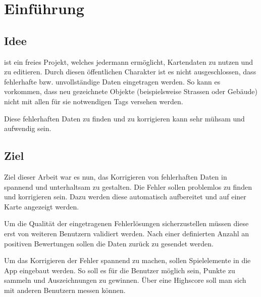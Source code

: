 \section{Einführung}

\subsection{Idee}
 ist ein freies Projekt, welches jedermann ermöglicht, Kartendaten zu nutzen und zu editieren.
Durch diesen öffentlichen Charakter ist es nicht ausgeschlossen, dass fehlerhafte bzw. unvollständige Daten eingetragen werden.
So kann es vorkommen, dass neu gezeichnete Objekte (beispielsweise Strassen oder Gebäude) nicht mit allen für sie notwendigen \glspl{Tag} versehen werden.

Diese fehlerhaften Daten zu finden und zu korrigieren kann sehr mühsam und aufwendig sein.

\subsection{Ziel}
Ziel dieser Arbeit war es nun, das Korrigieren von fehlerhaften Daten in  spannend und unterhaltsam zu gestalten.
Die Fehler sollen problemlos zu finden und korrigieren sein.
Dazu werden diese automatisch aufbereitet und auf einer Karte angezeigt werden.

Um die Qualität der eingetragenen Fehlerlösungen sicherzustellen müssen diese erst von weiteren Benutzern validiert werden.
Nach einer definierten Anzahl an positiven Bewertungen sollen die Daten zurück zu  gesendet werden.

Um das Korrigieren der Fehler spannend zu machen, sollen Spielelemente in die App eingebaut werden.
So soll es für die Benutzer möglich sein, Punkte zu sammeln und Auszeichnungen zu gewinnen. Über eine Highscore soll man sich mit anderen Benutzern messen können.